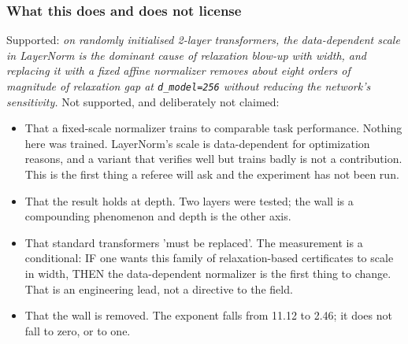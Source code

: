 \documentclass[10pt,journal]{IEEEtran}
\begin{document}
\subsubsection*{What this does and does not license}
Supported: \emph{on randomly initialised 2-layer transformers, the data-dependent scale in LayerNorm is the dominant cause of relaxation blow-up with width, and replacing it with a fixed affine normalizer removes about eight orders of magnitude of relaxation gap at \texttt{d\_model=256} without reducing the network's sensitivity.}
Not supported, and deliberately not claimed:
\begin{itemize}
\item That a fixed-scale normalizer trains to comparable task performance. Nothing here was trained. LayerNorm's scale is data-dependent for optimization reasons, and a variant that verifies well but trains badly is not a contribution. This is the first thing a referee will ask and the experiment has not been run.
\item That the result holds at depth. Two layers were tested; the wall is a compounding phenomenon and depth is the other axis.
\item That standard transformers 'must be replaced'. The measurement is a conditional: IF one wants this family of relaxation-based certificates to scale in width, THEN the data-dependent normalizer is the first thing to change. That is an engineering lead, not a directive to the field.
\item That the wall is removed. The exponent falls from 11.12 to 2.46; it does not fall to zero, or to one.
\end{itemize}
\end{document}
